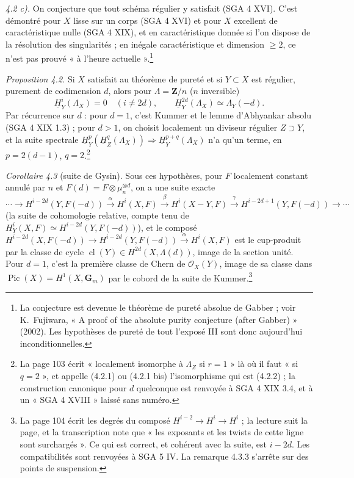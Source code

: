 \documentclass[11pt,a4paper]{article}
\begin{document}
\emph{4.2 c).} On conjecture que tout schéma régulier y satisfait (SGA 4 XVI).
C'est démontré pour $X$ lisse sur un corps (SGA 4 XVI) et pour $X$ excellent de
caractéristique nulle (SGA 4 XIX), et en caractéristique donnée si l'on dispose
de la résolution des singularités ; en inégale caractéristique et dimension
$\geq 2$, ce n'est pas prouvé « à l'heure actuelle ».\footnote{La conjecture est
devenue le théorème de pureté absolue de Gabber ; voir K.\ Fujiwara, « A proof of
the absolute purity conjecture (after Gabber) » (2002). Les hypothèses de
pureté de tout l'exposé III sont donc aujourd'hui inconditionnelles.}

\emph{Proposition 4.2.} Si $X$ satisfait au théorème de pureté et si $Y \subset X$
est régulier, purement de codimension $d$, alors pour $\Lambda = \mathbf{Z}/n$
($n$ inversible)
\[
  \underline H^i_Y(\Lambda_X) = 0 \quad (i \neq 2d), \qquad
  \underline H^{2d}_Y(\Lambda_X) \simeq \Lambda_Y(-d) .
\]
Par récurrence sur $d$ : pour $d = 1$, c'est Kummer et le lemme d'Abhyankar
absolu (SGA 4 XIX 1.3) ; pour $d > 1$, on choisit localement un diviseur
régulier $Z \supset Y$, et la suite spectrale $\underline H^p_Y(\underline
H^q_Z(\Lambda_X)) \Rightarrow \underline H^{p+q}_Y(\Lambda_X)$ n'a qu'un terme,
en $p = 2(d-1)$, $q = 2$.\footnote{La page 103 écrit « localement isomorphe à
$\Lambda_Z$ si $r = 1$ » là où il faut « si $q = 2$ », et appelle (4.2.1) ou
(4.2.1 bis) l'isomorphisme qui est (4.2.2) ; la construction canonique pour $d$
quelconque est renvoyée à SGA 4 XIX 3.4, et à un « SGA 4 XVIII » laissé sans
numéro.}

\emph{Corollaire 4.3} (suite de Gysin). Sous ces hypothèses, pour $F$ localement
constant annulé par $n$ et $F(d) = F \otimes \mu_n^{\otimes d}$, on a une suite
exacte
\[
  \cdots \to H^{i-2d}(Y, F(-d)) \xrightarrow{\ \alpha\ } H^i(X, F)
  \xrightarrow{\ \beta\ } H^i(X - Y, F) \xrightarrow{\ \gamma\ }
  H^{i-2d+1}(Y, F(-d)) \to \cdots
\]
(la suite de cohomologie relative, compte tenu de $H^i_Y(X,F) \simeq
H^{i-2d}(Y, F(-d))$), et le composé $H^{i-2d}(X, F(-d)) \to H^{i-2d}(Y, F(-d))
\xrightarrow{\alpha} H^i(X, F)$ est le cup-produit par la classe de cycle
$\operatorname{cl}(Y) \in H^{2d}(X, \Lambda(d))$, image de la section unité. Pour
$d = 1$, c'est la première classe de Chern de $\mathcal{O}_X(Y)$, image de sa
classe dans $\operatorname{Pic}(X) = H^1(X, \mathbf{G}_m)$ par le cobord de la
suite de Kummer.\footnote{La page 104 écrit les degrés du composé
$H^{i-2} \to H^i \to H^i$ ; la lecture suit la page, et la transcription note
que « les exposants et les twists de cette ligne sont surchargés ». Ce qui est
correct, et cohérent avec la suite, est $i - 2d$. Les compatibilités sont
renvoyées à SGA 5 IV. La remarque 4.3.3 s'arrête sur des points de suspension.}
\end{document}

